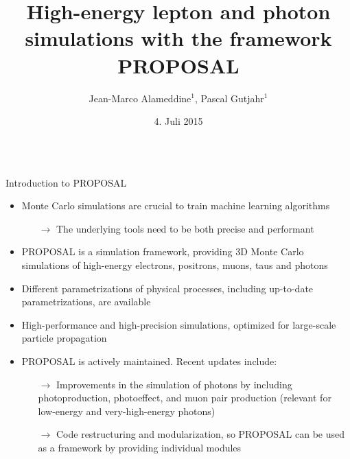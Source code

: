 \documentclass[t]{beamer}
\title{High-energy lepton and photon simulations with the framework PROPOSAL}
\author{Jean-Marco Alameddine$^{1}$, Pascal Gutjahr$^{1}$}
\institute[ETH]{$^{1}$TU Dortmund University, Otto-Hahn-Str. 4a, 44227 Dortmund, Germany}
\date{4. Juli 2015}
\newlength{\itemseparation}
\begin{document}
  \begin{columns}[onlytextwidth]%
    \begin{column}{0.45\textwidth}%
      \begin{block}[equal height group=F]{Introduction to PROPOSAL}%
  \begin{itemize}
    \setlength\itemsep{\itemseparation}
    \item Monte Carlo simulations are crucial to train machine learning algorithms
    \begin{itemize}
      \setlength\itemsep{\itemseparation}
      \item[$\rightarrow$] The underlying tools need to be both precise and performant
    \end{itemize}
    \item PROPOSAL is a simulation framework, providing 3D Monte Carlo simulations of high-energy electrons, positrons, muons, taus and photons \cite{koehne2013proposal, dunsch_2018_proposal_improvements}
    \item Different parametrizations of physical processes, including up-to-date parametrizations, are available
    \item High-performance and high-precision simulations, optimized for large-scale particle propagation
    \item PROPOSAL is actively maintained. Recent updates include:
    \begin{itemize}
      \item[$\rightarrow$] Improvements in the simulation of photons by including photoproduction, photoeffect, and muon pair production (relevant for low-energy and very-high-energy photons)
      \item[$\rightarrow$] Code restructuring and modularization, so PROPOSAL can be used as a framework by providing individual modules
    \end{itemize}
  \end{itemize}


\end{block}
\end{column}
\end{columns}
\end{document}
